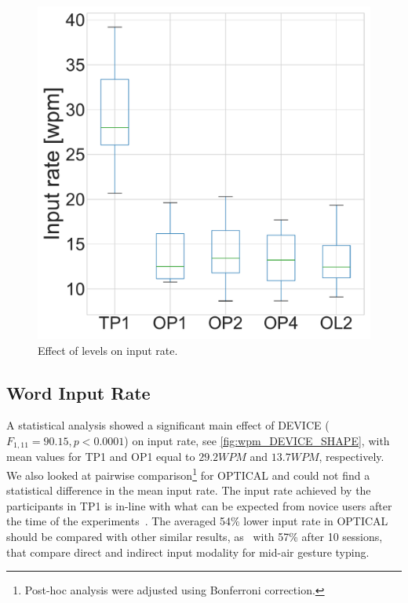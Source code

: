\documentclass{chi-ext}
\newcommand{\cdt}[1]{{\small\uppercase{{#1}}}}
\begin{document}
{\begin{figure}
    \centering
    \includegraphics[width=\linewidth]{figures/wpm_DEVICE_SHAPE.pdf}
    \caption{Effect of levels on input rate.}
    \label{fig:wpm_DEVICE_SHAPE}
\end{figure}
}

\subsection{Word Input Rate}
A statistical analysis showed a significant main effect of \cdt{DEVICE} ($F_{1,11} = 90.15, p < 0.0001$) on input rate, see \autoref{fig:wpm_DEVICE_SHAPE}, with mean values for \cdt{TP1} and \cdt{OP1} equal to $29.2 WPM$ and $13.7 WPM$, respectively. We also looked at pairwise comparison\footnote{Post-hoc analysis were adjusted using Bonferroni correction.} for \cdt{OPTICAL} and could not find a statistical difference in the mean input rate. The input rate achieved by the participants in \cdt{TP1} is in-line with what can be expected from novice users after the time of the experiments~\cite{Kristensson2004}. The averaged 54\% lower input rate in \cdt{OPTICAL} should be compared with other similar results, as~\cite{Markussen2014} with 57\% after 10 sessions, that compare direct and indirect input modality for mid-air gesture typing.
\end{document}
